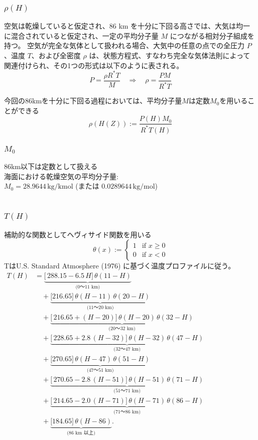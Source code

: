 \documentclass[a4paper,12pt]{article}
\begin{document}
\subsubsection{$\rho(H)$}
空気は乾燥していると仮定され、86 km を十分に下回る高さでは、大気は均一に混合されていると仮定され、一定の平均分子量 $M$ につながる相対分子組成を持つ。
空気が完全な気体として扱われる場合、大気中の任意の点での全圧力 $P$、温度 $T$、および全密度 $\rho$ は、状態方程式、すなわち完全な気体法則によって関連付けられ、その1つの形式は以下のように表される。
\[
P = \frac{\rho R^* T}{M} \quad \Rightarrow \quad \rho = \frac{P M}{R^* T}
\]

今回の86kmを十分に下回る過程においては、平均分子量$M$は定数$M_0$を用いることができる
\[
  \rho(H(Z)) := \frac{P(H) M_0}{R^* T(H)}
\]

\subsubsection{$M_0$}
86km以下は定数として扱える\\
海面における乾燥空気の平均分子量:\\ $M_0 = 28.9644 \, \mathrm{kg/kmol}$ (または $0.0289644 \, \mathrm{kg/mol}$)\\\\


\subsubsection{$T(H)$}
補助的な関数としてヘヴィサイド関数を用いる
$$
\theta(x) :=\left\{
  \begin{array}{ll}
    1 & \text{if } x \geq 0 \\
    0 & \text{if } x < 0
  \end{array}
\right.
$$
TはU.S. Standard Atmosphere (1976) に基づく温度プロファイルに従う。\\
$\begin{aligned}
T(H)
&=
\underbrace{\bigl[\,288.15 - 6.5\,H\bigr]\,
\theta(11 - H)}_{\text{(0～11 km)}} \\[6pt]
&\quad{}+ 
\underbrace{\bigl[216.65\bigr] \,
\theta(H - 11)\,\theta(20 - H)}_{\text{(11～20 km)}} \\[6pt]
&\quad{}+
\underbrace{\bigl[\,216.65 + (H - 20)\bigr]\,
\theta(H - 20)\,\theta(32 - H)}_{\text{(20～32 km)}} \\[6pt]
&\quad{}+
\underbrace{\bigl[\,228.65 + 2.8\,(H - 32)\bigr]\,
\theta(H - 32)\,\theta(47 - H)}_{\text{(32～47 km)}} \\[6pt]
&\quad{}+
\underbrace{\bigl[270.65\bigr] \,
\theta(H - 47)\,\theta(51 - H)}_{\text{(47～51 km)}} \\[6pt]
&\quad{}+
\underbrace{\bigl[\,270.65 - 2.8\,(H - 51)\bigr]\,
\theta(H - 51)\,\theta(71 - H)}_{\text{(51～71 km)}} \\[6pt]
&\quad{}+
\underbrace{\bigl[\,214.65 - 2.0\,(H - 71)\bigr]\,
\theta(H - 71)\,\theta(86 - H)}_{\text{(71～86 km)}} \\[6pt]
&\quad{}+
\underbrace{\bigl[184.65\bigr] \,
\theta(H - 86)}_{\text{(86 km 以上)}}.
\end{aligned}$
\end{document}
